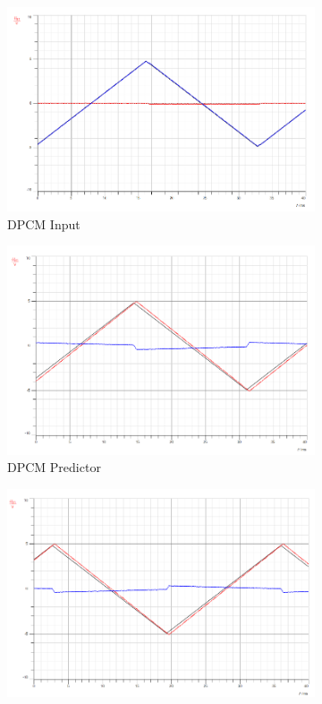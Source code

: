 \documentclass[12pt]{article}
\begin{document}
\begin{figure}[H]
    \begin{subfigure}[b]{0.32\textwidth}
        \centering
        \includegraphics[width=\textwidth]{assets/main/2023-08-26-23-07-23.png}
        \caption{DPCM Input}
    \end{subfigure}
    \begin{subfigure}[b]{0.32\textwidth}
        \centering
        \includegraphics[width=\textwidth]{assets/main/2023-08-26-23-07-45.png}
        \caption{DPCM Predictor}
    \end{subfigure}
    \begin{subfigure}[b]{0.32\textwidth}
        \centering
        \includegraphics[width=\textwidth]{assets/main/2023-08-26-23-10-45.png}

\end{subfigure}
\end{figure}
\end{document}

